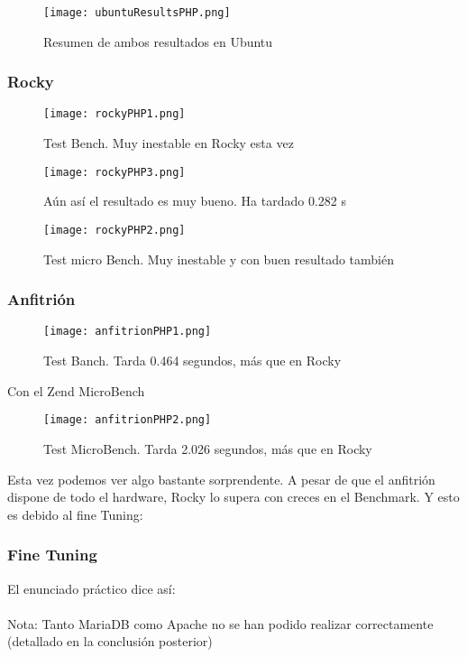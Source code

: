 \begin{figure}[H]
	\centering
	\texttt{[image: ubuntuResultsPHP.png]}
	\caption{Resumen de ambos resultados en Ubuntu}
\end{figure}

	
\subsubsection{Rocky}
\begin{figure}[H]
	\centering
	\texttt{[image: rockyPHP1.png]}
	\caption{Test Bench. Muy inestable en Rocky esta vez}
\end{figure}

\begin{figure}[H]
	\centering
	\texttt{[image: rockyPHP3.png]}
	\caption{Aún así el resultado es muy bueno. Ha tardado 0.282 s}
\end{figure}


\begin{figure}[H]
	\centering
	\texttt{[image: rockyPHP2.png]}
	\caption{Test micro Bench. Muy inestable y con buen resultado también \cite{rockyPHP}}
\end{figure}

\subsubsection{Anfitrión}
\begin{figure}[H]
	\centering
	\texttt{[image: anfitrionPHP1.png]}
	\caption{Test Banch. Tarda 0.464 segundos, más que en Rocky}
\end{figure}

Con el Zend MicroBench
\begin{figure}[H]
	\centering
	\texttt{[image: anfitrionPHP2.png]}
	\caption{Test MicroBench. Tarda 2.026 segundos, más que en Rocky\cite{anfitrionPHP}}
\end{figure}

Esta vez podemos ver algo bastante sorprendente. A pesar de que el anfitrión dispone de todo el hardware, Rocky lo supera con creces en el Benchmark. Y esto es debido al fine Tuning:
\subsubsection{Fine Tuning}
El enunciado práctico dice así: \\
\quad\\
Nota: Tanto MariaDB como Apache no se han podido realizar correctamente (detallado en la conclusión posterior)

